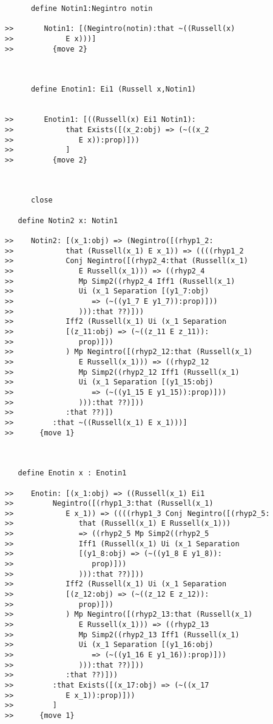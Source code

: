 \documentclass[12pt]{article}
\begin{document}
\begin{verbatim}
      define Notin1:Negintro notin

>>       Notin1: [(Negintro(notin):that ~((Russell(x)
>>            E x)))]
>>         {move 2}



      define Enotin1: Ei1 (Russell x,Notin1)


>>       Enotin1: [((Russell(x) Ei1 Notin1):
>>            that Exists([(x_2:obj) => (~((x_2
>>               E x)):prop)]))
>>            ]
>>         {move 2}



      close

   define Notin2 x: Notin1

>>    Notin2: [(x_1:obj) => (Negintro([(rhyp1_2:
>>            that (Russell(x_1) E x_1)) => ((((rhyp1_2
>>            Conj Negintro([(rhyp2_4:that (Russell(x_1)
>>               E Russell(x_1))) => ((rhyp2_4
>>               Mp Simp2((rhyp2_4 Iff1 (Russell(x_1)
>>               Ui (x_1 Separation [(y1_7:obj)
>>                  => (~((y1_7 E y1_7)):prop)]))
>>               ))):that ??)]))
>>            Iff2 (Russell(x_1) Ui (x_1 Separation
>>            [(z_11:obj) => (~((z_11 E z_11)):
>>               prop)]))
>>            ) Mp Negintro([(rhyp2_12:that (Russell(x_1)
>>               E Russell(x_1))) => ((rhyp2_12
>>               Mp Simp2((rhyp2_12 Iff1 (Russell(x_1)
>>               Ui (x_1 Separation [(y1_15:obj)
>>                  => (~((y1_15 E y1_15)):prop)]))
>>               ))):that ??)]))
>>            :that ??)])
>>         :that ~((Russell(x_1) E x_1)))]
>>      {move 1}



   define Enotin x : Enotin1

>>    Enotin: [(x_1:obj) => ((Russell(x_1) Ei1
>>         Negintro([(rhyp1_3:that (Russell(x_1)
>>            E x_1)) => ((((rhyp1_3 Conj Negintro([(rhyp2_5:
>>               that (Russell(x_1) E Russell(x_1)))
>>               => ((rhyp2_5 Mp Simp2((rhyp2_5
>>               Iff1 (Russell(x_1) Ui (x_1 Separation
>>               [(y1_8:obj) => (~((y1_8 E y1_8)):
>>                  prop)]))
>>               ))):that ??)]))
>>            Iff2 (Russell(x_1) Ui (x_1 Separation
>>            [(z_12:obj) => (~((z_12 E z_12)):
>>               prop)]))
>>            ) Mp Negintro([(rhyp2_13:that (Russell(x_1)
>>               E Russell(x_1))) => ((rhyp2_13
>>               Mp Simp2((rhyp2_13 Iff1 (Russell(x_1)
>>               Ui (x_1 Separation [(y1_16:obj)
>>                  => (~((y1_16 E y1_16)):prop)]))
>>               ))):that ??)]))
>>            :that ??)]))
>>         :that Exists([(x_17:obj) => (~((x_17
>>            E x_1)):prop)]))
>>         ]
>>      {move 1}




\end{verbatim}
\end{document}

